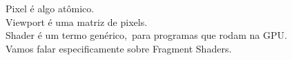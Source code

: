 \documentclass[preview]{standalone}
\begin{document}
Pixel é algo atômico.\\Viewport é uma matriz de pixels.\\Shader é um termo genérico,\ para programas que rodam na GPU.\\Vamos falar especificamente sobre Fragment Shaders.\\
\end{document}
